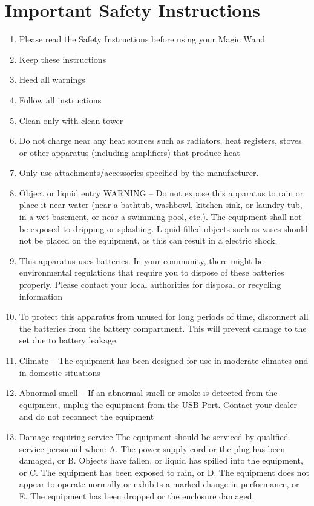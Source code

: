 %

%
%


\chapter{Important Safety Instructions}

\begin{enumerate}	
	\item Please read the Safety Instructions before using your Magic Wand
	\item Keep these instructions
	\item Heed all warnings
	\item Follow all instructions
	\item Clean only with clean tower
	\item Do not charge near any heat sources such as radiators, heat registers, stoves or other apparatus (including amplifiers) that produce heat
	\item Only use attachments/accessories specified by the
	manufacturer.
	\item Object or liquid entry
	WARNING – Do not expose this apparatus to rain or place it near water (near a bathtub, washbowl, kitchen sink, or laundry
	tub, in a wet basement, or near a swimming pool, etc.). The equipment shall not be exposed to dripping or splashing. Liquid-filled objects such as vases should not be placed on the equipment, as this can result in a electric shock. 
	\item This apparatus uses batteries. In your community, there might be environmental regulations that require you to
	dispose of these batteries properly. Please contact your local authorities for disposal or recycling information
	\item To protect this apparatus from unused for long periods of time, disconnect all the batteries from the battery compartment. This will prevent damage to the set due to battery leakage. 
	\item Climate -- The equipment has been designed for use in
	moderate climates and in domestic situations
	\item Abnormal smell -- If an abnormal smell or smoke is detected from the equipment, unplug the equipment from the USB-Port. Contact your dealer and do not reconnect the equipment
	\item Damage requiring service 
	The equipment should be serviced by qualified service personnel when:
	A. The power-supply cord or the plug has been
	damaged, or
	B. Objects have fallen, or liquid has spilled into the
	equipment, or
	C. The equipment has been exposed to rain, or
	D. The equipment does not appear to operate
	normally or exhibits a marked change in
	performance, or
	E. The equipment has been dropped or the
	enclosure damaged.
\end{enumerate}